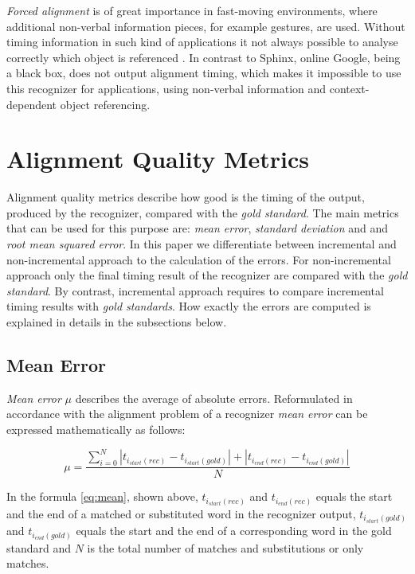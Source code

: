 \textit {Forced alignment} is of great importance in fast-moving environments,
where additional non-verbal information pieces, for example gestures, are used. 
Without timing information in such kind of applications it not always possible to
analyse correctly which object is referenced 
\parencite {Baumann2016}.  In contrast to Sphinx, online Google, being a black
box, does not output alignment timing, which makes it impossible to use this 
recognizer for applications, using non-verbal information and context-dependent
object referencing. 

\section {Alignment Quality Metrics}
Alignment quality metrics describe how good is the timing of the output,
produced by the recognizer, compared with the \textit {gold standard}. The main
metrics that can be used for this purpose are: \textit {mean error}, \textit {standard deviation} and 
and \textit {root mean squared error}. In this paper we
differentiate between incremental and non-incremental approach to the
calculation of the errors.  For non-incremental approach only the
final timing result of the recognizer are compared with the \textit {gold
standard}. By contrast, incremental approach requires to compare incremental
timing results with \textit {gold standards}.  How exactly the errors are
computed is explained in details in the subsections below. 
\subsection {Mean Error} \textit {Mean error}  $\mu$ 
describes the average of absolute errors. Reformulated in accordance with
the alignment problem of a recognizer  \textit {mean error}   can be expressed
mathematically as follows:
\begin{center} 
\begin{equation} \mu=\frac{\sum_{i=0}^N
|t_{i_{start}(rec)}-t_{i_{start}(gold)}|+|t_{i_{end}(rec)}-t_{i_{end}(gold)}|}{N}
\label{eq:mean}
\end{equation}
\end{center} In the formula  \ref {eq:mean}, shown above, 
$t_{i_{start}(rec)}$ and $t_{i_{end}(rec)}$ equals the start and the end of a
matched or substituted word in the recognizer output,
$t_{i_{start}(gold)}$ and $t_{i_{end}(gold)}$ equals the start and the end of
a corresponding word in the gold standard and $N$ is the total number of matches
and substitutions or only matches.

